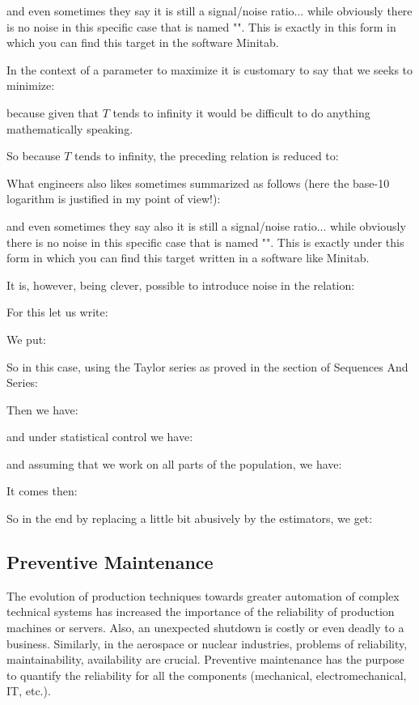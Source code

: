 	and even sometimes they say it is still a signal/noise ratio... while obviously there is no noise in this specific case that is named "". This is exactly in this form in which you can find this target in the software Minitab.
	
	In the context of a parameter to maximize it is customary to say that we seeks to minimize:
	
	because given that $T$ tends to infinity it would be difficult to do anything mathematically speaking.
	
	So because $T$ tends to infinity, the preceding relation is reduced to:
	
	What engineers also likes sometimes summarized as follows (here the base-10 logarithm is justified in my point of view!):
	
	and even sometimes they say also it is still a signal/noise ratio... while obviously there is no noise in this specific case that is named "". This is exactly  under this form in which you can find this target written in a software like Minitab.
	
	It is, however, being clever, possible to introduce noise in the relation:
	
	For this let us write:
	
	We put:
	
	So in this case, using the Taylor series as proved in the section of Sequences And Series:
	
	Then we have:
	
	and under statistical control we have:
	
	and assuming that we work on all parts of the population, we have:
	
	It comes then:
	
	So in the end by replacing a little bit abusively by the estimators, we get:
	
	
	\pagebreak
	\subsection{Preventive Maintenance}\label{preventive maintenance}
	The evolution of production techniques towards greater automation of complex technical systems has increased the importance of the reliability of production machines or servers. Also, an unexpected shutdown is costly or even deadly to a business. Similarly, in the aerospace or nuclear industries, problems of reliability, maintainability, availability are crucial. Preventive maintenance has the purpose to quantify the reliability for all the components (mechanical, electromechanical, IT, etc.).
	
